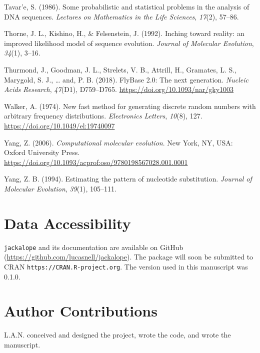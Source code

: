 \documentclass[12pt,]{article}
\begin{document}
\leavevmode\hypertarget{ref-Tavare_1986gtr}{}%
Tavar\a'e, S. (1986). Some probabilistic and statistical problems in the analysis of DNA sequences. \emph{Lectures on Mathematics in the Life Sciences}, \emph{17}(2), 57--86.

\leavevmode\hypertarget{ref-Thorne_1992}{}%
Thorne, J. L., Kishino, H., \& Felsenstein, J. (1992). Inching toward reality: an improved likelihood model of sequence evolution. \emph{Journal of Molecular Evolution}, \emph{34}(1), 3--16.

\leavevmode\hypertarget{ref-Thurmond_2018}{}%
Thurmond, J., Goodman, J. L., Strelets, V. B., Attrill, H., Gramates, L. S., Marygold, S. J., \ldots{} and, P. B. (2018). FlyBase 2.0: The next generation. \emph{Nucleic Acids Research}, \emph{47}(D1), D759--D765. \url{https://doi.org/10.1093/nar/gky1003}

\leavevmode\hypertarget{ref-Walker_1974}{}%
Walker, A. (1974). New fast method for generating discrete random numbers with arbitrary frequency distributions. \emph{Electronics Letters}, \emph{10}(8), 127. \url{https://doi.org/10.1049/el:19740097}

\leavevmode\hypertarget{ref-Yang_2006}{}%
Yang, Z. (2006). \emph{Computational molecular evolution}. New York, NY, USA: Oxford University Press. \url{https://doi.org/10.1093/acprof:oso/9780198567028.001.0001}

\leavevmode\hypertarget{ref-Yang_1994}{}%
Yang, Z. B. (1994). Estimating the pattern of nucleotide substitution. \emph{Journal of Molecular Evolution}, \emph{39}(1), 105--111.


\hypertarget{data-accessibility}{%
\section{Data Accessibility}\label{data-accessibility}}

\texttt{jackalope} and its documentation are available on GitHub
(\url{https://github.com/lucasnell/jackalope}).
The package will soon be submitted to CRAN \texttt{https://CRAN.R-project.org}.
The version used in this manuscript was 0.1.0.

\hypertarget{author-contributions}{%
\section{Author Contributions}\label{author-contributions}}

L.A.N. conceived and designed the project, wrote the code, and wrote the manuscript.
\end{document}
